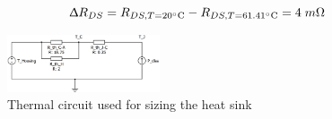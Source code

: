 \begin{equation} \label{delta_resistance}
\Updelta R_{DS} = R_{DS, T = 20 \decC} - R_{DS, T = 61.41\decC} = 4\; m \Omega
\end{equation}

\begin{figure}[htbp]
	\begin{center}
		\includegraphics[width=0.4\textwidth]{../Pictures/thermal_circuit.png}
		\caption{Thermal circuit used for sizing the heat sink}
		\label{thermal_circuit}
	\end{center}	
\end{figure}



